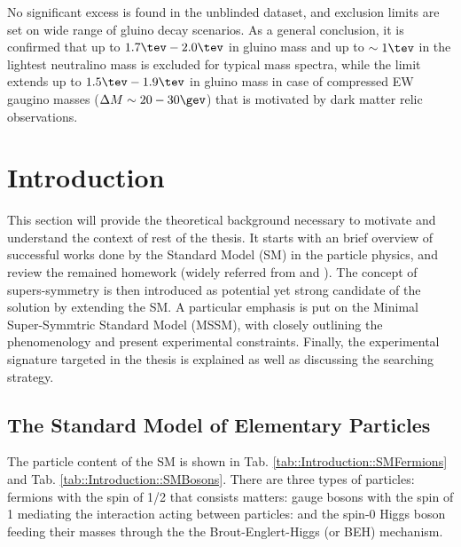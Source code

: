 No significant excess is found in the unblinded dataset, and exclusion limits are set on wide range of gluino decay scenarios. As a general conclusion,
it is confirmed that up to $1.7\tev - 2.0 \tev$ in gluino mass and up to $\sim 1\tev$ in the lightest neutralino mass is excluded for typical mass spectra, 
while the limit extends up to $1.5\tev - 1.9 \tev$ in gluino mass in case of compressed EW gaugino masses ($\Delta M \sim 20-30\gev$) that is motivated by dark matter relic observations.



\clearpage





%
\section{Introduction}
This section will provide the theoretical background necessary to motivate and understand the context of rest of the thesis.
It starts with an brief overview of successful works done by the Standard Model (SM) in the particle physics, and review the remained homework (widely referred from \cite{Peskin} and \cite{QandL}).
The concept of supers-symmetry is then introduced as potential yet strong candidate of the solution by extending the SM.
A particular emphasis is put on the Minimal Super-Symmtric Standard Model (MSSM), with closely outlining the phenomenology and present experimental constraints.
Finally, the experimental signature targeted in the thesis is explained as well as discussing the searching strategy. \\


\subsection{The Standard Model of Elementary Particles}
The particle content of the SM is shown in Tab. \ref{tab::Introduction::SMFermions} and Tab. \ref{tab::Introduction::SMBosons}. There are three types of particles: fermions with the spin of 1/2 that consists matters: gauge bosons with the spin of 1 mediating the interaction acting between particles: and the spin-0 Higgs boson feeding their masses through the the Brout-Englert-Higgs (or BEH) mechanism. \\

